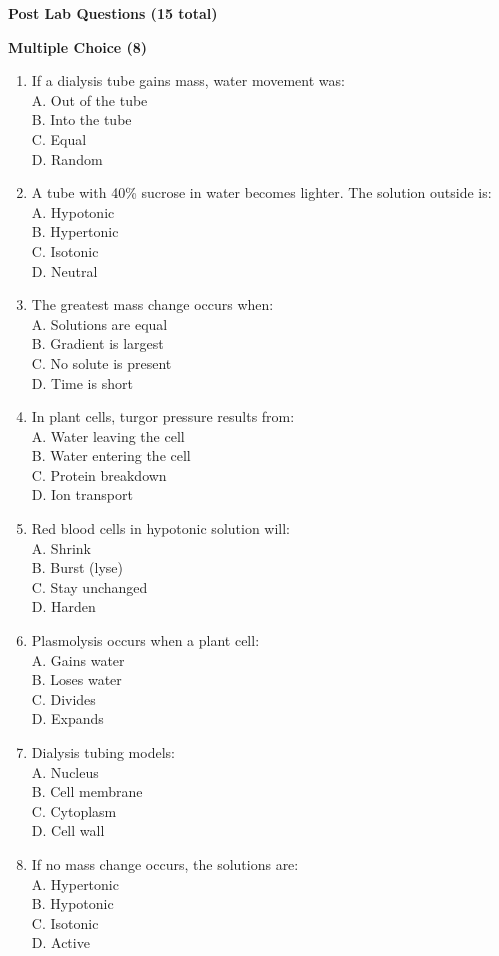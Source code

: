 \documentclass[
  letterpaper,
  DIV=11,
  numbers=noendperiod]{scrreprt}
\begin{document}
\textbf{Post Lab Questions (15 total)}

\textbf{Multiple Choice (8)}

\begin{enumerate}
\def\labelenumi{\arabic{enumi}.}
\item
  If a dialysis tube gains mass, water movement was:\\
  A. Out of the tube\\
  B. Into the tube\\
  C. Equal\\
  D. Random
\item
  A tube with 40\% sucrose in water becomes lighter. The solution
  outside is:\\
  A. Hypotonic\\
  B. Hypertonic\\
  C. Isotonic\\
  D. Neutral
\item
  The greatest mass change occurs when:\\
  A. Solutions are equal\\
  B. Gradient is largest\\
  C. No solute is present\\
  D. Time is short
\item
  In plant cells, turgor pressure results from:\\
  A. Water leaving the cell\\
  B. Water entering the cell\\
  C. Protein breakdown\\
  D. Ion transport
\item
  Red blood cells in hypotonic solution will:\\
  A. Shrink\\
  B. Burst (lyse)\\
  C. Stay unchanged\\
  D. Harden
\item
  Plasmolysis occurs when a plant cell:\\
  A. Gains water\\
  B. Loses water\\
  C. Divides\\
  D. Expands
\item
  Dialysis tubing models:\\
  A. Nucleus\\
  B. Cell membrane\\
  C. Cytoplasm\\
  D. Cell wall
\item
  If no mass change occurs, the solutions are:\\
  A. Hypertonic\\
  B. Hypotonic\\
  C. Isotonic\\
  D. Active
\end{enumerate}
\end{document}
